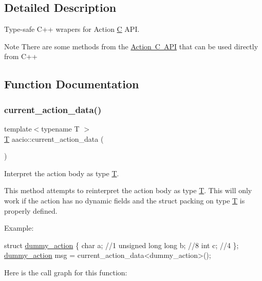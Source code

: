 \subsection{Detailed Description}
Type-\/safe C++ wrapers for Action \mbox{\hyperlink{struct_c}{C}} A\+PI. 

\begin{DoxyNote}{Note}
There are some methods from the \mbox{\hyperlink{group__actioncapi}{Action C A\+PI}} that can be used directly from C++ 
\end{DoxyNote}


\subsection{Function Documentation}
\mbox{\label{group__actioncppapi_ga1dbfc575654dd0016e4701e719edbe28}} 
\subsubsection{\texorpdfstring{current\+\_\+action\+\_\+data()}{current\_action\_data()}}
{\footnotesize\ttfamily template$<$typename T $>$ \\
\mbox{\hyperlink{struct_t}{T}} aacio\+::current\+\_\+action\+\_\+data (\begin{DoxyParamCaption}{ }\end{DoxyParamCaption})}



Interpret the action body as type \mbox{\hyperlink{struct_t}{T}}. 

This method attempts to reinterpret the action body as type \mbox{\hyperlink{struct_t}{T}}. This will only work if the action has no dynamic fields and the struct packing on type \mbox{\hyperlink{struct_t}{T}} is properly defined.

Example\+: 
\begin{DoxyCode}
\textcolor{keyword}{struct }\mbox{\hyperlink{structdummy__action}{dummy\_action}} \{
  \textcolor{keywordtype}{char} a; \textcolor{comment}{//1}
  \textcolor{keywordtype}{unsigned} \textcolor{keywordtype}{long} \textcolor{keywordtype}{long} b; \textcolor{comment}{//8}
  \textcolor{keywordtype}{int}  c; \textcolor{comment}{//4}
\};
\mbox{\hyperlink{structdummy__action}{dummy\_action}} msg = current\_action\_data<dummy\_action>();
\end{DoxyCode}
 Here is the call graph for this function\+:
\mbox{\label{group__actioncppapi_ga21fa91780aa540fc37c9db54fec25afb}} 
